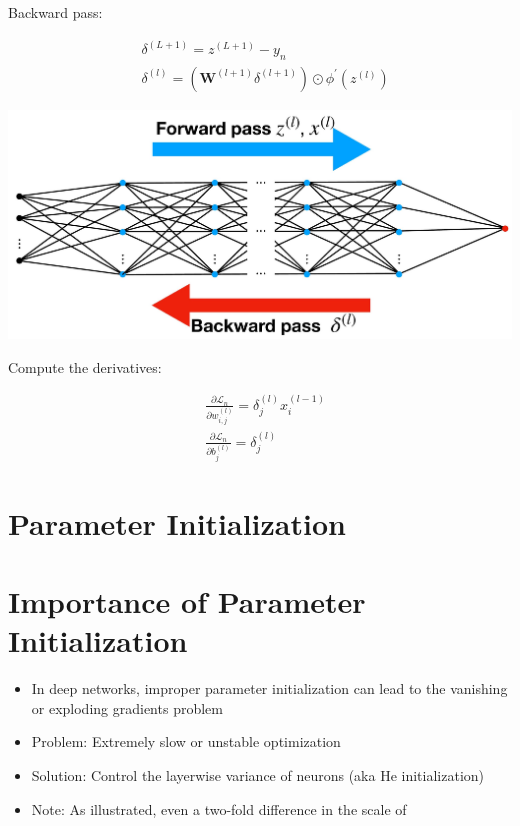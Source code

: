 \documentclass[10pt]{article}
\begin{document}
Backward pass:

$$
\begin{aligned}
& \delta^{(L+1)}=z^{(L+1)}-y_{n} \\
& \delta^{(l)}=\left(\mathbf{W}^{(l+1)} \delta^{(l+1)}\right) \odot \phi^{\prime}\left(z^{(l)}\right)
\end{aligned}
$$

\begin{center}
\includegraphics[max width=\textwidth]{2023_12_30_360102aa01a03e5a4270g-20}
\end{center}

Compute the derivatives:

$$
\begin{aligned}
& \frac{\partial \mathscr{L}_{n}}{\partial w_{i, j}^{(l)}}=\delta_{j}^{(l)} x_{i}^{(l-1)} \\
& \frac{\partial \mathscr{L}_{n}}{\partial b_{j}^{(l)}}=\delta_{j}^{(l)}
\end{aligned}
$$

\section*{Parameter Initialization}
\section*{Importance of Parameter Initialization}
\begin{itemize}
  \item In deep networks, improper parameter initialization can lead to the vanishing or exploding gradients problem

  \item Problem: Extremely slow or unstable optimization

  \item Solution: Control the layerwise variance of neurons (aka He initialization)

  \item Note: As illustrated, even a two-fold difference in the scale of

\end{itemize}
\end{document}
